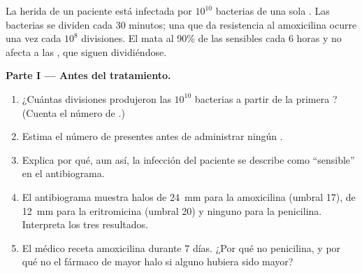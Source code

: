 \begin{problem}
\label{pb:g11:antibiotic-resistance:1}
La herida de un paciente está infectada por $10^{10}$ bacterias de una
sola . Las bacterias se dividen cada 30 minutos; una 
que da resistencia al  amoxicilina ocurre una vez cada
$10^8$ divisiones. El  mata al 90\% de las  sensibles
cada 6 horas y no afecta a las , que siguen dividiéndose.

\medskip
\noindent\textbf{Parte I --- Antes del tratamiento.}
\begin{enumerate}
  \item ¿Cuántas divisiones produjeron las $10^{10}$ bacterias a partir
        de la primera ? (Cuenta el número de .)
  \item Estima el número de   presentes antes de
        administrar ningún .
  \item Explica por qué, aun así, la infección del paciente se describe
        como ``sensible'' en el antibiograma.
  \item El antibiograma muestra halos de \qty{24}{mm} para la
        amoxicilina (umbral 17), de \qty{12}{mm} para la eritromicina
        (umbral 20) y ninguno para la penicilina. Interpreta los tres
        resultados.
  \item El médico receta amoxicilina durante 7 días. ¿Por qué no
        penicilina, y por qué no el fármaco de mayor halo si alguno
        hubiera sido mayor?
\end{enumerate}


\end{problem}
